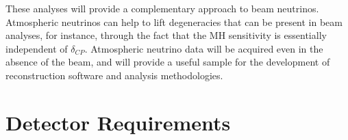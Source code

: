 

These analyses will provide a complementary approach to beam neutrinos.   Atmospheric neutrinos can 
help to lift degeneracies that can be present in beam analyses, for instance, through the fact that the 
MH sensitivity is essentially independent of $\delta_{CP}$.   Atmospheric neutrino data will be acquired 
even in the absence of the beam, and will provide a useful sample for the development of 
reconstruction software and analysis methodologies.  

\section{Detector Requirements}
\label{sec:physics-atmpdk-detector-requirements}
